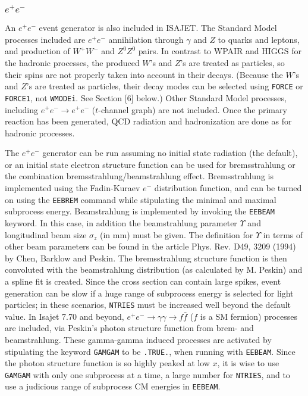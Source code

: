 \subsubsection{$e^+e^-$} An $e^+e^-$ event generator is also included in
ISAJET. The
Standard Model processes included are $e^+e^-$ annihilation through
$\gamma$ and $Z$ to quarks and leptons, and production of $W^+W^-$ and
$Z^0Z^0$ pairs. In contrast to WPAIR and HIGGS for the hadronic
processes, the produced $W$'s and $Z$'s are treated as particles, so
their spins are not properly taken into account in their decays.
(Because the $W$'s and $Z$'s are treated as particles, their decay
modes can be selected using \verb|FORCE| or \verb|FORCE1|, not
\verb|WMODEi|. See Section [6] below.)  Other Standard Model
processes, including $e^+ e^- \to e^+ e^-$ ($t$-channel graph) 
are not included.  Once the primary reaction has been
generated, QCD radiation and hadronization are done as for hadronic
processes. 

The $e^+e^-$ generator can be run assuming no initial state
radiation (the default), or an initial state electron structure function
can be used for bremsstrahlung or the combination bremsstrahlung/beamstrahlung
effect. Bremsstrahlung is implemented using the Fadin-Kuraev
$e^-$ distribution function, and can be turned on using the \verb|EEBREM|
command while stipulating the minimal and maximal subprocess energy.
Beamstrahlung is implemented by invoking the \verb|EEBEAM| keyword.
In this case, in addition the beamstrahlung parameter $\Upsilon$ and
longitudinal beam size $\sigma_z$ (in mm) must be given.
The definition for $\Upsilon$ in terms of other beam parameters can be 
found in the article Phys. Rev. D49, 3209 (1994) by Chen, Barklow and Peskin.
The bremsstrahlung structure function is then convoluted with the 
beamstrahlung distribution (as calculated by M. Peskin) and a spline fit
is created. Since the cross section can contain large spikes, event generation
can be slow if a huge range of subprocess energy is selected for light 
particles; in these scenarios, \verb|NTRIES| must be increased well beyond
the default value.
In Isajet 7.70 and beyond, $e^+e^-\to\gamma\gamma\to f\bar{f}$ 
($f$ is a SM fermion) processes are included, via Peskin's 
photon structure function from brem- and beamstrahlung. These
gamma-gamma induced processes are activated by stipulating the keyword
\verb|GAMGAM| to be \verb|.TRUE.|, when running with \verb|EEBEAM|.
Since the photon structure function is so highly peaked at low $x$, 
it is wise to use \verb|GAMGAM| with only one subprocess at a time, 
a large number for \verb|NTRIES|, and to
use a judicious range of subprocess CM energies in \verb|EEBEAM|.

